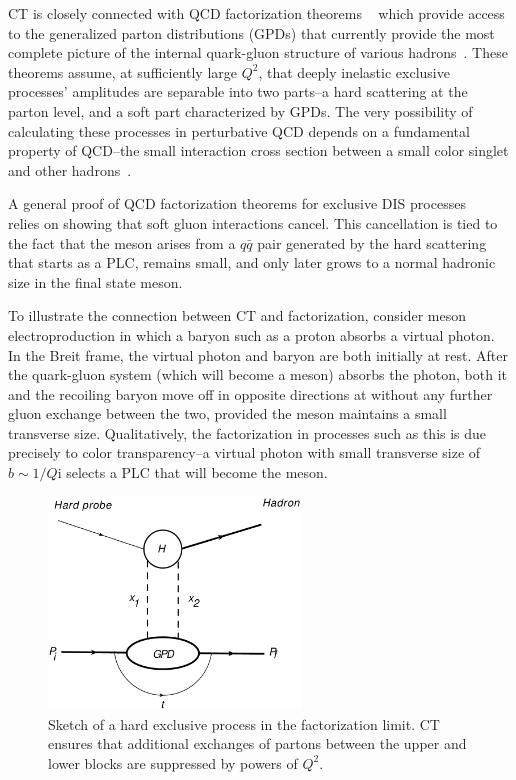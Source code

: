 CT is closely connected with QCD factorization
theorems ~\cite{Brodsky_1994, Collins_1997, Frankfurt_1999, Diehl_1998, Strikman_2000}
which provide access to the generalized parton distributions (GPDs)
that currently provide the most complete picture of the internal
quark-gluon structure of various hadrons~\cite{Ji_1997_Jan, Ji_1997_Jun,
Radyushkin_1996, Radyushkin_1997}.
These theorems assume, at sufficiently large $Q^2$, that deeply inelastic
exclusive processes' amplitudes are separable into two parts--a hard scattering
at the parton level, and a soft part characterized by GPDs.
The very possibility of calculating these processes in perturbative QCD depends
on a fundamental property of QCD--the small interaction cross section
between a small color singlet and other hadrons~\cite{Strikman_2000}.

A general proof of QCD factorization theorems for exclusive DIS processes
~\cite{Collins_1997, Collins_1998} relies on showing that soft gluon
interactions cancel.
This cancellation is tied to the fact that the meson arises from a $q\bar{q}$
pair generated by the hard scattering that starts as a PLC, remains small, and
only later grows to a normal hadronic size in the final state meson.

To illustrate the connection between CT and factorization, consider
meson electroproduction in which a baryon such as a proton absorbs a virtual
photon.
In the Breit frame, the virtual photon and baryon are both initially at rest.
After the quark-gluon system (which will become a meson) absorbs the photon,
both it and the recoiling baryon move off in opposite directions at without any
further gluon exchange between the two,
provided the meson maintains a small transverse size.
Qualitatively, the factorization in processes such as this is due precisely to
color transparency--a virtual photon with small transverse size of $b\sim1/Q$i
selects a PLC that will become the meson.

\begin{figure}[H]
    \centering
    \includegraphics[width=0.6\textwidth]{chap2/factorization.pdf}
    \caption[Sketch of a hard exclusive process in the factorization limit.]{
            Sketch of a hard exclusive process in the factorization limit.
            CT ensures that additional exchanges of partons between the upper
            and lower blocks are suppressed by powers of $Q^2$.
    }
    \label{fig:factorization_handbag}
\end{figure}


